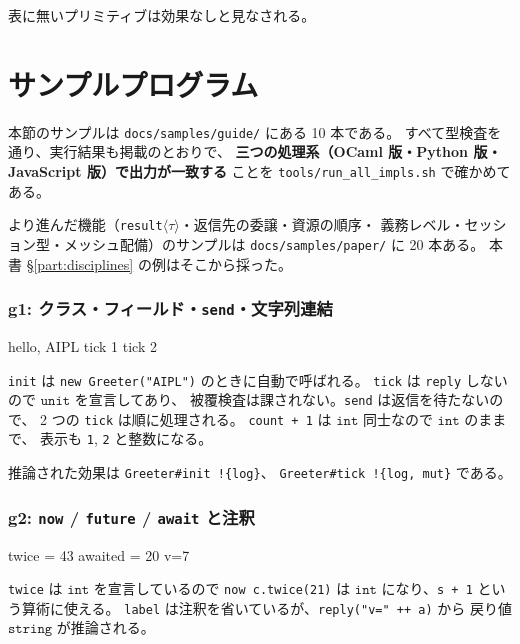 \documentclass[11pt,a4paper]{ltjsarticle}
\newcommand{\ty}[1]{\ensuremath{\mathtt{#1}}}
\begin{document}
表に無いプリミティブは効果なしと見なされる。

\part{サンプルプログラム}
\label{part:sample}

本節のサンプルは \texttt{docs/samples/guide/} にある 10 本である。
すべて型検査を通り、実行結果も掲載のとおりで、
\textbf{三つの処理系（OCaml 版・Python 版・JavaScript 版）で出力が一致する}
ことを \texttt{tools/run\_all\_impls.sh} で確かめてある。

より進んだ機能（\texttt{result}$\langle\tau\rangle$・返信先の委譲・資源の順序・
義務レベル・セッション型・メッシュ配備）のサンプルは
\texttt{docs/samples/paper/} に 20 本ある。
本書 \S\ref{part:disciplines} の例はそこから採った。

\section{g1: クラス・フィールド・\texttt{send}・文字列連結}



\begin{term}
hello, AIPL
tick 1
tick 2
\end{term}

\texttt{init} は \texttt{new Greeter("AIPL")} のときに自動で呼ばれる。
\texttt{tick} は \texttt{reply} しないので \ty{unit} を宣言してあり、
被覆検査は課されない。\texttt{send} は返信を待たないので、
2 つの \texttt{tick} は順に処理される。
\texttt{count + 1} は \ty{int} 同士なので \ty{int} のままで、
表示も \texttt{1}, \texttt{2} と整数になる。

推論された効果は \texttt{Greeter\#init !\{log\}}、
\texttt{Greeter\#tick !\{log, mut\}} である。

\section{g2: \texttt{now} / \texttt{future} / \texttt{await} と注釈}



\begin{term}
twice = 43
awaited = 20
v=7
\end{term}

\texttt{twice} は \ty{int} を宣言しているので \texttt{now c.twice(21)} は
\ty{int} になり、\texttt{s + 1} という算術に使える。
\texttt{label} は注釈を省いているが、\texttt{reply("v=" ++ a)} から
戻り値 \ty{string} が推論される。
\end{document}

